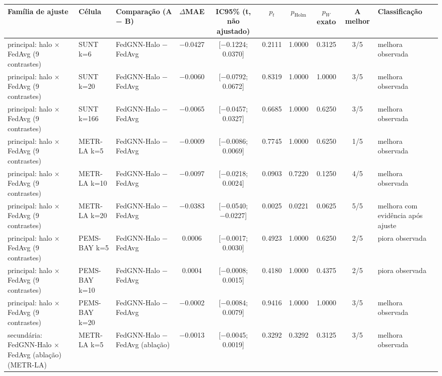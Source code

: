 
\begin{tabular}{lllccccccl}
\toprule
Família de ajuste & Célula & Comparação (A − B) & $\Delta$MAE & IC95\% (t, não ajustado) & $p_t$ & $p_{\mathrm{Holm}}$ & $p_W$ exato & A melhor & Classificação \\
\midrule
principal: halo × FedAvg (9 contrastes) & SUNT k=6 & FedGNN-Halo − FedAvg & \num{-0.0427} & [\num{-0.1224}; \num{+0.0370}] & \num{0.2111} & \num{1.0000} & \num{0.3125} & 3/5 & melhora observada \\
principal: halo × FedAvg (9 contrastes) & SUNT k=20 & FedGNN-Halo − FedAvg & \num{-0.0060} & [\num{-0.0792}; \num{+0.0672}] & \num{0.8319} & \num{1.0000} & \num{1.0000} & 3/5 & melhora observada \\
principal: halo × FedAvg (9 contrastes) & SUNT k=166 & FedGNN-Halo − FedAvg & \num{-0.0065} & [\num{-0.0457}; \num{+0.0327}] & \num{0.6685} & \num{1.0000} & \num{0.6250} & 3/5 & melhora observada \\
principal: halo × FedAvg (9 contrastes) & METR-LA k=5 & FedGNN-Halo − FedAvg & \num{-0.0009} & [\num{-0.0086}; \num{+0.0069}] & \num{0.7745} & \num{1.0000} & \num{0.6250} & 1/5 & melhora observada \\
principal: halo × FedAvg (9 contrastes) & METR-LA k=10 & FedGNN-Halo − FedAvg & \num{-0.0097} & [\num{-0.0218}; \num{+0.0024}] & \num{0.0903} & \num{0.7220} & \num{0.1250} & 4/5 & melhora observada \\
principal: halo × FedAvg (9 contrastes) & METR-LA k=20 & FedGNN-Halo − FedAvg & \num{-0.0383} & [\num{-0.0540}; \num{-0.0227}] & \num{0.0025} & \num{0.0221} & \num{0.0625} & 5/5 & melhora com evidência após ajuste \\
principal: halo × FedAvg (9 contrastes) & PEMS-BAY k=5 & FedGNN-Halo − FedAvg & \num{+0.0006} & [\num{-0.0017}; \num{+0.0030}] & \num{0.4923} & \num{1.0000} & \num{0.6250} & 2/5 & piora observada \\
principal: halo × FedAvg (9 contrastes) & PEMS-BAY k=10 & FedGNN-Halo − FedAvg & \num{+0.0004} & [\num{-0.0008}; \num{+0.0015}] & \num{0.4180} & \num{1.0000} & \num{0.4375} & 2/5 & piora observada \\
principal: halo × FedAvg (9 contrastes) & PEMS-BAY k=20 & FedGNN-Halo − FedAvg & \num{-0.0002} & [\num{-0.0084}; \num{+0.0079}] & \num{0.9416} & \num{1.0000} & \num{1.0000} & 3/5 & melhora observada \\
secundária: FedGNN-Halo × FedAvg (ablação) (METR-LA) & METR-LA k=5 & FedGNN-Halo − FedAvg (ablação) & \num{-0.0013} & [\num{-0.0045}; \num{+0.0019}] & \num{0.3292} & \num{0.3292} & \num{0.3125} & 3/5 & melhora observada \\

\end{tabular}
